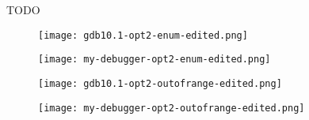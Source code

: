 

TODO

\begin{figure}[h]
    \centering
    \texttt{[image: gdb10.1-opt2-enum-edited.png]}
    \label{fig:gdbenum}
\end{figure}


\begin{figure}[h]
    \centering
    \texttt{[image: my-debugger-opt2-enum-edited.png]}
    \label{fig:mydebuggerenum}
\end{figure}


\begin{figure}[h]
    \centering
    \texttt{[image: gdb10.1-opt2-outofrange-edited.png]}
    \label{fig:gdboutofrange}
\end{figure}


\begin{figure}[h]
    \centering
    \texttt{[image: my-debugger-opt2-outofrange-edited.png]}
    \label{fig:mydebuggeroutofrange}
\end{figure}

